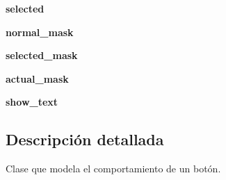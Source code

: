 \begin{DoxyCompactItemize}
\item 
\hypertarget{classengine_1_1button_1_1Button_a22243d3280d4a9db69b1594bad6b9d4c}{
{\bfseries selected}}
\label{classengine_1_1button_1_1Button_a22243d3280d4a9db69b1594bad6b9d4c}

\item 
\hypertarget{classengine_1_1button_1_1Button_a7f883d37647370b83946ef5f59325965}{
{\bfseries normal\-\_\-mask}}
\label{classengine_1_1button_1_1Button_a7f883d37647370b83946ef5f59325965}

\item 
\hypertarget{classengine_1_1button_1_1Button_a442c1f51e307472121ac897c0f691bd6}{
{\bfseries selected\-\_\-mask}}
\label{classengine_1_1button_1_1Button_a442c1f51e307472121ac897c0f691bd6}

\item 
\hypertarget{classengine_1_1button_1_1Button_a74daf005c9a4877fef5878381ef70861}{
{\bfseries actual\-\_\-mask}}
\label{classengine_1_1button_1_1Button_a74daf005c9a4877fef5878381ef70861}

\item 
\hypertarget{classengine_1_1button_1_1Button_a1a63e6a05d37e04bc67521d019dc58e3}{
{\bfseries show\-\_\-text}}
\label{classengine_1_1button_1_1Button_a1a63e6a05d37e04bc67521d019dc58e3}

\end{DoxyCompactItemize}


\subsection{\-Descripción detallada}
\-Clase que modela el comportamiento de un botón. 

